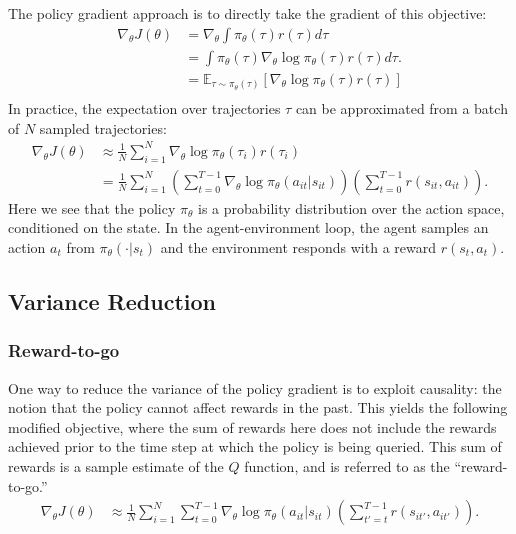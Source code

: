 \documentclass{article}
\begin{document}
The policy gradient approach is to directly take the gradient of this objective:
\begin{align}
\nabla_\theta J(\theta) &= \nabla_\theta \int \pi_\theta(\tau) r(\tau) d\tau \label{policygradientintegral} \\ 
&= \int \pi_\theta(\tau) \nabla_\theta \log \pi_\theta(\tau) r(\tau) d\tau. \label{scorefunctionpg}\\
&= \mathbb{E}_{\tau \sim \pi_\theta(\tau)}\left[\nabla_\theta \log \pi_\theta(\tau) r(\tau)\right]\\
\end{align}
In practice, the expectation over trajectories $\tau$ can be approximated from a batch of $N$ sampled trajectories:
\begin{align}
\nabla_\theta J(\theta) &\approx \frac{1}{N} \sum_{i=1}^N \nabla_\theta \log \pi_\theta(\tau_i) r(\tau_i) \\
&= \frac{1}{N} \sum_{i=1}^N \left(\sum_{t=0}^{T-1} \nabla_\theta \log \pi_\theta(a_{it} | s_{it})\right)\left(\sum_{t=0}^{T-1} r(s_{it}, a_{it})\right). \label{estimatedscorefunctionpg}
\end{align}
Here we see that the policy $\pi_\theta$ is a probability distribution over the action space, conditioned on the state. In the agent-environment loop, the agent samples an action $a_t$ from $\pi_\theta(\cdot | s_t)$ and the environment responds with a reward $r(s_t, a_t)$.


\subsection{Variance Reduction}


\subsubsection{Reward-to-go}
One way to reduce the variance of the policy gradient is to exploit causality: the notion that the policy cannot affect rewards in the past. This yields the following modified objective, where the sum of rewards here does not include the rewards achieved prior to the time step at which the policy is being queried. This sum of rewards is a sample estimate of the $Q$ function, and is referred to as the ``reward-to-go.''
\begin{align}
\nabla_\theta J(\theta) &\approx \frac{1}{N} \sum_{i=1}^N \sum_{t=0}^{T-1} \nabla_\theta \log \pi_\theta(a_{it} | s_{it})\left(\sum_{t'=t}^{T-1} r(s_{it'}, a_{it'})\right).
\end{align}
\end{document}

